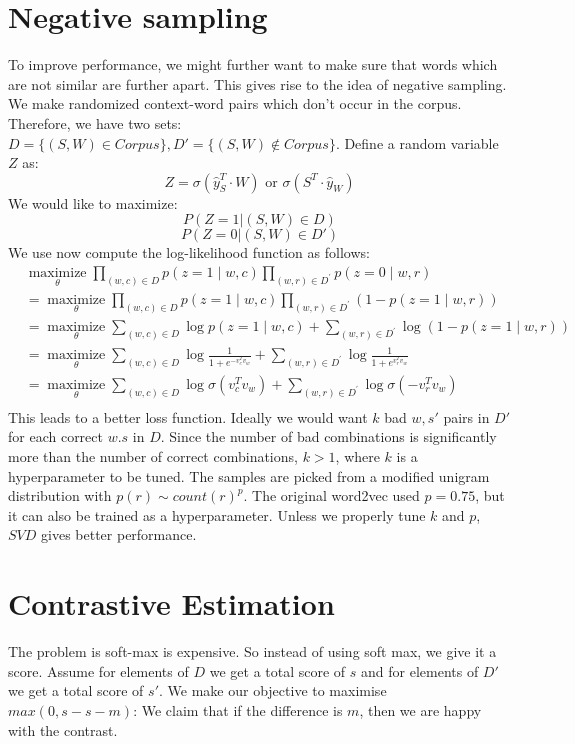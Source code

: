 \section{Negative sampling}
To improve performance, we might further want to make sure that words which are not similar are further apart. This gives rise to the idea of negative sampling. We make randomized context-word pairs which don't occur in the corpus. Therefore, we have two sets: $D=\{(S,W)\in Corpus\},D'=\{(S,W)\notin Corpus\}$. Define a random variable $Z$ as:
$$Z=\sigma\left(\hat y_{S}^T\cdot W\right)\text{ or }\sigma\left({S}^T\cdot \hat y_{W}\right)$$
We would like to maximize:
$$P(Z=1|(S,W)\in D)$$
$$P(Z=0|(S,W)\in D')$$
We use now compute the log-likelihood function as follows:\\
$\begin{aligned} & \underset{\theta}{\operatorname{maximize}} \prod_{(w, c) \in D} p(z=1 \mid w, c) \prod_{(w, r) \in D^{\prime}} p(z=0 \mid w, r) \\ & =\underset{\theta}{\operatorname{maximize}} \prod_{(w, c) \in D} p(z=1 \mid w, c) \prod_{(w, r) \in D^{\prime}}(1-p(z=1 \mid w, r)) \\ & =\underset{\theta}{\operatorname{maximize}} \sum_{(w, c) \in D} \log p(z=1 \mid w, c) +\sum_{(w, r) \in D^{\prime}} \log (1-p(z=1 \mid w, r)) \\ & =\underset{\theta}{\operatorname{maximize}} \sum_{(w, c) \in D} \log \frac{1}{1+e^{-v_c^T v_w}}+\sum_{(w, r) \in D^{\prime}} \log \frac{1}{1+e^{v_r^T v_w}} \\ & =\underset{\theta}{\operatorname{maximize}} \sum_{(w, c) \in D} \log \sigma\left(v_c^T v_w\right)+\sum_{(w, r) \in D^{\prime}} \log \sigma\left(-v_r^T v_w\right) \\ & \end{aligned}$\\
This leads to a better loss function. Ideally we would want $k$ bad $w,s'$ pairs in $D'$ for each correct $w.s$ in $D$. Since the number of bad combinations is significantly more than the number of correct combinations, $k>1$, where $k$ is a hyperparameter to be tuned. The samples are picked from a modified unigram distribution with $p(r)\sim count(r)^{p}$. The original word2vec used $p=0.75$, but it can also be trained as a hyperparameter. Unless we properly tune $k$ and $p$, $SVD$ gives better performance. 
\section{Contrastive Estimation}
The problem is soft-max is expensive. So instead of using soft max, we give it a score.  Assume for elements of $D$ we get a total score of $s$ and for elements of $D'$ we get a total score of $s'$. We make our objective to maximise $max(0,s-s-m)$: We claim that if the difference is $m$, then we are happy with the contrast.







